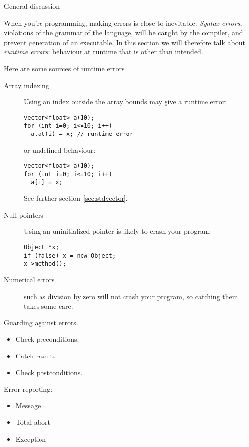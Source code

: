 
 {General discussion}

When you're programming, making errors is close to inevitable.
%
\emph{Syntax errors}, violations of the grammar of
the language, will be caught by the compiler, and prevent generation
of an executable. In this section we will therefore talk about
%
\emph{runtime errors}: behaviour at runtime that
is other than intended.

Here are some sources of runtime errors
\begin{description}
\item[Array indexing] Using an index outside the array bounds may give
  a runtime error:
\begin{lstlisting}
vector<float> a(10);
for (int i=0; i<=10; i++)
  a.at(i) = x; // runtime error
\end{lstlisting}
or undefined behaviour:
\begin{lstlisting}
vector<float> a(10);
for (int i=0; i<=10; i++)
  a[i] = x;
\end{lstlisting}
See further section~\ref{sec:stdvector}.
\item[Null pointers] Using an uninitialized pointer is likely to crash
  your program:
\begin{lstlisting}
Object *x;
if (false) x = new Object;
x->method();
\end{lstlisting}
\item[Numerical errors] such as division by zero will not crash your
  program, so catching them takes some care.
\end{description}

Guarding against errors.
\begin{itemize}
\item Check preconditions.
\item Catch results.
\item Check postconditions.
\end{itemize}

Error reporting:
\begin{itemize}
\item Message
\item Total abort
\item Exception
\end{itemize}

